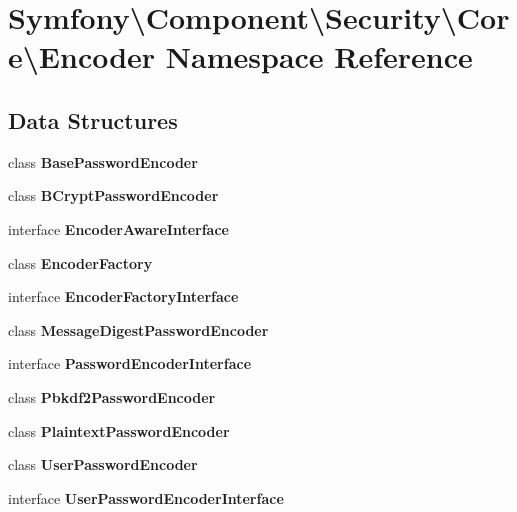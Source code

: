 \section{Symfony\textbackslash{}Component\textbackslash{}Security\textbackslash{}Core\textbackslash{}Encoder Namespace Reference}
\label{namespace_symfony_1_1_component_1_1_security_1_1_core_1_1_encoder}
\subsection*{Data Structures}
\begin{DoxyCompactItemize}
\item 
class {\bf Base\+Password\+Encoder}
\item 
class {\bf B\+Crypt\+Password\+Encoder}
\item 
interface {\bf Encoder\+Aware\+Interface}
\item 
class {\bf Encoder\+Factory}
\item 
interface {\bf Encoder\+Factory\+Interface}
\item 
class {\bf Message\+Digest\+Password\+Encoder}
\item 
interface {\bf Password\+Encoder\+Interface}
\item 
class {\bf Pbkdf2\+Password\+Encoder}
\item 
class {\bf Plaintext\+Password\+Encoder}
\item 
class {\bf User\+Password\+Encoder}
\item 
interface {\bf User\+Password\+Encoder\+Interface}
\end{DoxyCompactItemize}
